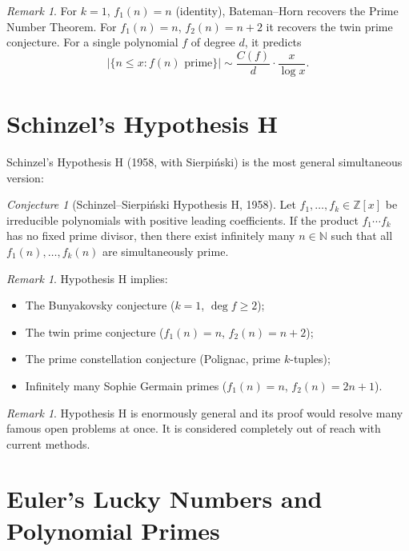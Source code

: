 \documentclass[12pt,a4paper]{amsart}
\theoremstyle{definition}
\theoremstyle{remark}
\newtheorem{remark}[theorem]{Remark}
\newtheorem{conjecture}[theorem]{Conjecture}
\newcommand{\N}{\mathbb{N}}
\newcommand{\Z}{\mathbb{Z}}
\begin{document}
\begin{remark}
For $k = 1$, $f_1(n) = n$ (identity), Bateman--Horn recovers the Prime Number
Theorem.
For $f_1(n) = n$, $f_2(n) = n + 2$ it recovers the twin prime conjecture.
For a single polynomial $f$ of degree $d$, it predicts
\[
  |\{n \leq x : f(n) \text{ prime}\}| \sim \frac{C(f)}{d} \cdot \frac{x}{\log x}.
\]
\end{remark}

\section{Schinzel's Hypothesis H}

Schinzel's Hypothesis H (1958, with Sierpiński) is the most general
simultaneous version:

\begin{conjecture}[Schinzel--Sierpiński Hypothesis H, 1958]
\label{conj:H}
Let $f_1, \ldots, f_k \in \Z[x]$ be irreducible polynomials with positive
leading coefficients.
If the product $f_1 \cdots f_k$ has no fixed prime divisor, then there
exist infinitely many $n \in \N$ such that all $f_1(n), \ldots, f_k(n)$ are
simultaneously prime.
\end{conjecture}

\begin{remark}
Hypothesis H implies:
\begin{itemize}[nosep]
  \item The Bunyakovsky conjecture ($k = 1$, $\deg f \geq 2$);
  \item The twin prime conjecture ($f_1(n) = n$, $f_2(n) = n + 2$);
  \item The prime constellation conjecture (Polignac, prime $k$-tuples);
  \item Infinitely many Sophie Germain primes ($f_1(n) = n$, $f_2(n) = 2n+1$).
\end{itemize}
\end{remark}

\begin{remark}
Hypothesis H is enormously general and its proof would resolve many famous
open problems at once. It is considered completely out of reach with current methods.
\end{remark}

\section{Euler's Lucky Numbers and Polynomial Primes}
\end{document}
